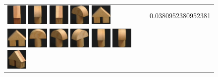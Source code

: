 \begin{figure}[tbp]
\begin{center}
\begin{tabular}{m{11cm} | m{3cm} |}
\includegraphics[width=1cm]{coil/beeld-44.eps}
\includegraphics[width=1cm]{coil/beeld-2.eps}
\includegraphics[width=1cm]{coil/beeld-47.eps}
\includegraphics[width=1cm]{coil/beeld-4.eps}
\includegraphics[width=1cm]{coil/beeld-42.eps}
& {\scriptsize 0.0380952380952381}
\\
\includegraphics[width=1cm]{coil/beeld-42.eps}
\includegraphics[width=1cm]{coil/beeld-0.eps}
\includegraphics[width=1cm]{coil/beeld-4.eps}
\includegraphics[width=1cm]{coil/beeld-3.eps}
\includegraphics[width=1cm]{coil/beeld-2.eps}
\includegraphics[width=1cm]{coil/beeld-5.eps}
\includegraphics[width=1cm]{coil/beeld-46.eps}

\end{tabular}
\end{center}
\end{figure}
